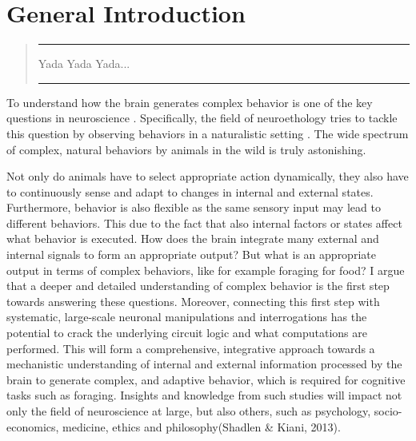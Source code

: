
%

\chapter{General Introduction}
\label{cha:introduction}


\epigraphfontsize{\small\itshape}
\setlength\epigraphwidth{12.5cm}
\setlength\epigraphrule{0pt}


\begin{quote}
   \rule{\linewidth}{2pt}
 Yada Yada Yada...
 \hfill \raisebox{-1ex}{\itshape Seinfeld, Season 8, Episode 19 (1997)}\\[-1ex]
   \rule{\linewidth}{2pt}
 \end{quote}


To understand how the brain generates complex behavior is one of the key questions in neuroscience \needscite. Specifically, the field of neuroethology tries to tackle this question by observing behaviors in a naturalistic setting \needscite. The wide spectrum of complex, natural behaviors by animals in the wild is truly astonishing.

Not only do animals have to select appropriate action dynamically, they also have to continuously sense and adapt to changes in internal and external states. Furthermore, behavior is also flexible as the same sensory input may lead to different behaviors. This due to the fact that also internal factors or states affect what behavior is executed. How does the brain integrate many external and internal signals to form an appropriate output? But what is an appropriate output in terms of complex behaviors, like for example foraging for food?
I argue that a deeper and detailed understanding of complex behavior is the first step towards answering these questions. Moreover, connecting this first step with systematic, large-scale neuronal manipulations and interrogations has the potential to crack the underlying circuit logic and what computations are performed. This will form a comprehensive, integrative approach towards a mechanistic understanding of internal and external information processed by the brain to generate complex, and adaptive behavior, which is required for cognitive tasks such as foraging. Insights and knowledge from such studies will impact not only the field of neuroscience at large, but also others, such as psychology, socio-economics, medicine, ethics and philosophy\needscite(Shadlen \& Kiani, 2013).

